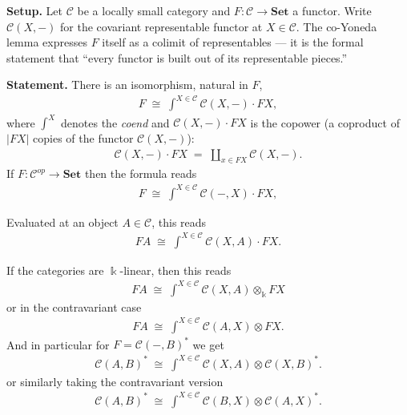 \documentclass[11pt]{article}
\theoremstyle{definition}
\begin{document}
\textbf{Setup.} Let $\mathcal{C}$ be a locally small category and $F : \mathcal{C} \to \mathbf{Set}$
a functor. Write $\mathcal{C}(X,-)$ for the covariant representable functor at $X \in \mathcal{C}$.
The co-Yoneda lemma expresses $F$ itself as a colimit of representables --- it is the
formal statement that ``every functor is built out of its representable pieces.''

\bigskip
\textbf{Statement.} There is an isomorphism, natural in $F$,
\begin{align}
F \;\cong\; \int^{X \in \mathcal{C}} \mathcal{C}(X,-) \cdot FX,
\end{align}
where $\int^{X}$ denotes the \emph{coend} and $\mathcal{C}(X,-) \cdot FX$ is the copower
(a coproduct of $|FX|$ copies of the functor $\mathcal{C}(X,-)$):
\begin{align}
\mathcal{C}(X,-) \cdot FX \;=\; \coprod_{x \in FX} \mathcal{C}(X,-).
\end{align}
If $F : \mathcal{C}^{op} \to \mathbf{Set}$ then the formula reads
\begin{align}
F \;\cong\; \int^{X \in \mathcal{C}} \mathcal{C}(-,X) \cdot FX,
\end{align}


Evaluated at an object $A \in \mathcal{C}$, this reads
\begin{align}
FA \;\cong\; \int^{X \in \mathcal{C}} \mathcal{C}(X,A) \cdot FX.
\end{align}

If the categories are $\Bbbk$-linear, then this reads
\begin{align}
\boxed{
FA \;\cong\; \int^{X \in \mathcal{C}} \mathcal{C}(X,A) \otimes_\Bbbk FX
}
\end{align}
or in the contravariant case
\begin{align}
FA \;\cong\; \int^{X \in \mathcal{C}} \mathcal{C}(A,X) \otimes FX.
\end{align}
And in particular for $F=\mathcal{C}(-,B)^*$ we get
\begin{align}
\mathcal{C}(A,B)^* \;\cong\; \int^{X \in \mathcal{C}} \mathcal{C}(X,A) \otimes \mathcal{C}(X,B)^*.
\end{align}
or similarly taking the contravariant version
\begin{align}
\boxed{
\mathcal{C}(A,B)^* \;\cong\; \int^{X \in \mathcal{C}} \mathcal{C}(B,X) \otimes \mathcal{C}(A,X)^*.}
\end{align}
\end{document}
